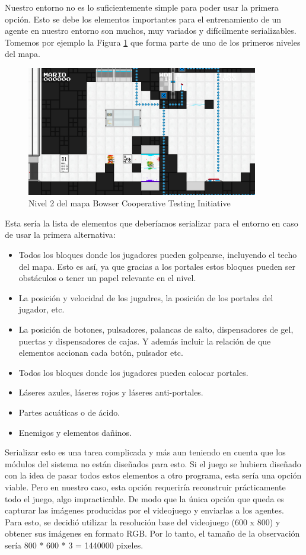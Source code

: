 Nuestro entorno no es lo suficientemente simple para poder usar la primera opción. Esto se debe los elementos importantes para el entrenamiento de un agente en nuestro entorno son muchos, muy variados y difícilmente serializables. Tomemos por ejemplo la Figura \ref {fig:observartion} que forma parte de uno de los primeros niveles del mapa. 
\begin{figure}[h]
    \centering
    \includegraphics[width=0.9\textwidth]{img/BCTI_observation.png}
    \caption{Nivel 2 del mapa Bowser Cooperative Testing Initiative \cite {mari0-mapa}}
    \label{fig:observartion}
\end{figure}

Esta sería la lista de elementos que deberíamos serializar para el entorno en caso de usar la primera alternativa:

\begin{itemize}
    \item Todos los bloques donde los jugadores pueden golpearse, incluyendo el techo del mapa. Esto es así, ya que gracias a los portales estos bloques pueden ser obstáculos o tener un papel relevante en el nivel.
    \item La posición y velocidad de los jugadres, la posición de los portales del jugador, etc.
    \item La posición de botones, pulsadores, palancas de salto, dispensadores de gel, puertas y dispensadores de cajas. Y además incluir la relación de que elementos accionan cada botón, pulsador etc.
    \item Todos los bloques donde los jugadores pueden colocar portales.
    \item Láseres azules, láseres rojos y láseres anti-portales.
    \item Partes acuáticas o de ácido.
    \item Enemigos y elementos dañinos.
\end{itemize}

Serializar esto es una tarea complicada y más aun teniendo en cuenta que los módulos del sistema no están diseñados para esto. Si el juego se hubiera diseñado con la idea de pasar todos estos elementos a otro programa, esta sería una opción viable. Pero en nuestro caso, esta opción requeriría reconstruir prácticamente todo el juego, algo impracticable. De modo que la única opción que queda es capturar las imágenes producidas por el videojuego y enviarlas a los agentes. Para esto, se decidió utilizar la resolución base del videojuego (600 x 800) y obtener sus imágenes en formato RGB. Por lo tanto, el tamaño de la observación sería 800 * 600 * 3 = 1440000 pixeles.